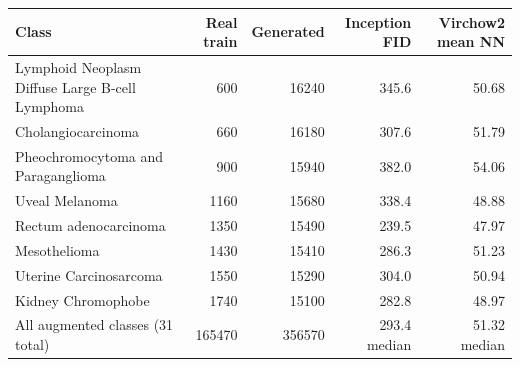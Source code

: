 \begin{tabularx}{\linewidth}{@{}>{\raggedright\arraybackslash}Xrrrr@{}}
\toprule
Class & Real train & Generated & Inception FID & Virchow2 mean NN\\
\midrule
Lymphoid Neoplasm Diffuse Large B-cell Lymphoma & \num{600} & \num{16240} & \num{345.6} & \num{50.68}\\
Cholangiocarcinoma & \num{660} & \num{16180} & \num{307.6} & \num{51.79}\\
Pheochromocytoma and Paraganglioma & \num{900} & \num{15940} & \num{382.0} & \num{54.06}\\
Uveal Melanoma & \num{1160} & \num{15680} & \num{338.4} & \num{48.88}\\
Rectum adenocarcinoma & \num{1350} & \num{15490} & \num{239.5} & \num{47.97}\\
Mesothelioma & \num{1430} & \num{15410} & \num{286.3} & \num{51.23}\\
Uterine Carcinosarcoma & \num{1550} & \num{15290} & \num{304.0} & \num{50.94}\\
Kidney Chromophobe & \num{1740} & \num{15100} & \num{282.8} & \num{48.97}\\
\midrule
All augmented classes (31 total) & \num{165470} & \num{356570} & \num{293.4} median & \num{51.32} median\\
\bottomrule
\end{tabularx}
